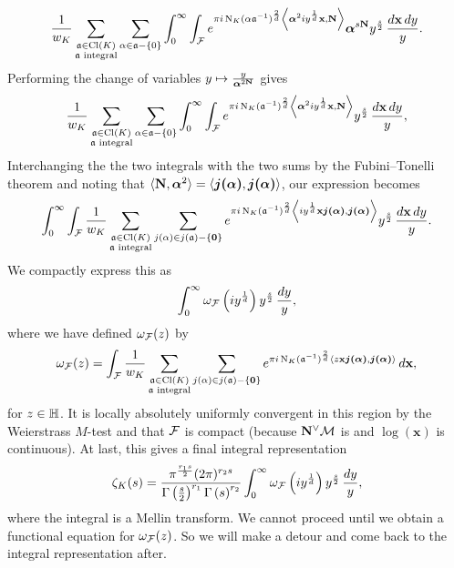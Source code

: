       \[
        \frac{1}{w_{K}}\sum_{\substack{\mathfrak{a} \in \operatorname{\mathrm{Cl}}(K) \\ \text{$\mathfrak{a}$ integral}}}\sum_{\alpha \in \mathfrak{a}-\{0\}}\int_{0}^{\infty}\int_{\mathcal{F}}e^{\pi i\operatorname{\mathrm{N}}_{K}(\alpha\mathfrak{a}^{-1})^{\frac{2}{d}}\left\langle\boldsymbol{\alpha}^{2}iy^{\frac{1}{d}}\mathbf{x},\mathbf{N}\right\rangle}\boldsymbol{\alpha}^{s\mathbf{N}}y^{\frac{s}{2}}\,\frac{d\mathbf{x}\,dy}{y}.
      \]
      Performing the change of variables $y \mapsto \frac{y}{\boldsymbol{\alpha}^{2\mathbf{N}}}$ gives
      \[
        \frac{1}{w_{K}}\sum_{\substack{\mathfrak{a} \in \operatorname{\mathrm{Cl}}(K) \\ \text{$\mathfrak{a}$ integral}}}\sum_{\alpha \in \mathfrak{a}-\{0\}}\int_{0}^{\infty}\int_{\mathcal{F}}e^{\pi i\operatorname{\mathrm{N}}_{K}(\mathfrak{a}^{-1})^{\frac{2}{d}}\left\langle\boldsymbol{\alpha}^{2}iy^{\frac{1}{d}}\mathbf{x},\mathbf{N}\right\rangle}y^{\frac{s}{2}}\,\frac{d\mathbf{x}\,dy}{y},
      \]
      Interchanging the the two integrals with the two sums by the Fubini–Tonelli theorem and noting that $\langle\mathbf{N},\boldsymbol{\alpha}^{2}\rangle = \langle\boldsymbol{j(\alpha)},\boldsymbol{j(\alpha)}\rangle$, our expression becomes
      \[
        \int_{0}^{\infty}\int_{\mathcal{F}}\frac{1}{w_{K}}\sum_{\substack{\mathfrak{a} \in \operatorname{\mathrm{Cl}}(K) \\ \text{$\mathfrak{a}$ integral}}}\sum_{j(\alpha) \in j(\mathfrak{a})-\{\mathbf{0}\}}e^{\pi i\operatorname{\mathrm{N}}_{K}(\mathfrak{a}^{-1})^{\frac{2}{d}}\left\langle iy^{\frac{1}{d}}\mathbf{x}\boldsymbol{j(\alpha)},\boldsymbol{j(\alpha)}\right\rangle}y^{\frac{s}{2}}\,\frac{d\mathbf{x}\,dy}{y}.
      \]
      We compactly express this as
      \[
        \int_{0}^{\infty}\omega_{\mathcal{F}}\left(iy^{\frac{1}{d}}\right)y^{\frac{s}{2}}\,\frac{dy}{y},
      \]
      where we have defined $\omega_{\mathcal{F}}(z)$ by
      \[
        \omega_{\mathcal{F}}(z) = \int_{\mathcal{F}}\frac{1}{w_{K}}\sum_{\substack{\mathfrak{a} \in \operatorname{\mathrm{Cl}}(K) \\ \text{$\mathfrak{a}$ integral}}}\sum_{j(\alpha) \in j(\mathfrak{a})-\{\mathbf{0}\}}e^{\pi i\operatorname{\mathrm{N}}_{K}(\mathfrak{a}^{-1})^{\frac{2}{d}}\langle z\mathbf{x}\boldsymbol{j(\alpha)},\boldsymbol{j(\alpha)}\rangle}\,d\mathbf{x},
      \]
      for $z \in \mathbb{H}$. It is locally absolutely uniformly convergent in this region by the Weierstrass $M$-test and that $\mathcal{F}$ is compact (because $\mathbf{N}^{\vee}\mathcal{M}$ is and $\log(\mathbf{x})$ is continuous). At last, this gives a final integral representation
      \begin{equation}\label{equ:integral_representation_Dedekind_1}
        \zeta_{K}(s) = \frac{\pi^{\frac{r_{1}s}{2}}(2\pi)^{r_{2}s}}{\Gamma\left(\frac{s}{2}\right)^{r_{1}}\Gamma\left(s\right)^{r_{2}}}\int_{0}^{\infty}\omega_{\mathcal{F}}\left(iy^{\frac{1}{d}}\right)y^{\frac{s}{2}}\,\frac{dy}{y},
      \end{equation}
      where the integral is a Mellin transform. We cannot proceed until we obtain a functional equation for $\omega_{\mathcal{F}}(z)$. So we will make a detour and come back to the integral representation after.

